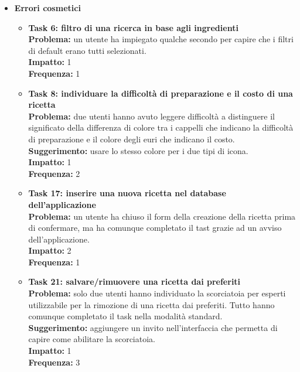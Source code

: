 \begin{itemize}
	\item \textbf{Errori cosmetici}
		\begin{itemize}
			\item \textbf{Task 6: filtro di una ricerca in base agli ingredienti}\\
				\textbf{Problema:} un utente ha impiegato qualche secondo per capire che i
				filtri di default erano tutti selezionati.\\
				\textbf{Impatto:} 1\\
				\textbf{Frequenza:} 1\\

			\item \textbf{Task 8: individuare la difficoltà di preparazione e il costo di una ricetta}\\
				\textbf{Problema:} due utenti hanno avuto leggere difficoltà a distinguere
				il significato della differenza di colore tra i cappelli che indicano la
				difficoltà di preparazione e il colore degli euri che indicano il
				costo.\\
				\textbf{Suggerimento:} usare lo stesso colore per i due tipi di icona.\\
				\textbf{Impatto:} 1\\
				\textbf{Frequenza:} 2\\

			\item \textbf{Task 17: inserire una nuova ricetta nel database
				dell'applicazione}\\
				\textbf{Problema:} un utente ha chiuso il form della creazione
				della ricetta prima di confermare, ma ha comunque completato il tast
				grazie ad un avviso dell'applicazione.\\
				\textbf{Impatto:} 2 \\
				\textbf{Frequenza:} 1\\
			
			\item \textbf{Task 21: salvare/rimuovere una ricetta dai preferiti}\\
				\textbf{Problema:} solo due utenti hanno individuato la scorciatoia per
				esperti utilizzabile per la rimozione di una ricetta dai preferiti.
				Tutto hanno comunque completato il task nella modalità standard.\\
				\textbf{Suggerimento:} aggiungere un invito
				nell'interfaccia che permetta di capire come abilitare la scorciatoia.\\
				\textbf{Impatto:} 1\\
				\textbf{Frequenza:} 3\\
		\end{itemize}
		

\end{itemize}

